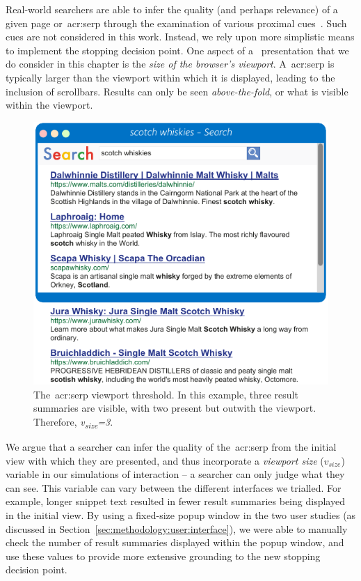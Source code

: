 Real-world searchers are able to infer the quality (and perhaps relevance) of a given page or~\gls{acr:serp} through the examination of various proximal cues~\citep{chi2001information_scent}. Such cues are not considered in this work. Instead, we rely upon more simplistic means to implement the stopping decision point. One aspect of a~ presentation that we do consider in this chapter is the \emph{size of the browser's viewport}. A~\gls{acr:serp} is typically larger than the viewport within which it is displayed, leading to the inclusion of scrollbars. Results can only be seen \emph{above-the-fold}, or what is visible within the viewport.

\begin{figure}
    \begin{center}
    \vspace*{-9mm}
    \includegraphics[width=1\textwidth]{figures/ch6-viewport.pdf}
    \end{center}
    \vspace*{-2mm}
    \caption[Viewport cutoff example]{The~\gls{acr:serp} viewport threshold. In this example, three result summaries are visible, with two present but outwith the viewport. Therefore, \emph{v\textsubscript{size}=3}.}
    \label{fig:viewport_cutoff}
\end{figure}

We argue that a searcher can infer the quality of the~\gls{acr:serp} from the initial view with which they are presented, and thus incorporate a \emph{viewport size} ($v_{size}$) variable in our simulations of interaction -- a searcher can only judge what they can see. This variable can vary between the different interfaces we trialled. For example, longer snippet text resulted in fewer result summaries being displayed in the initial view. By using a fixed-size popup window in the two user studies (as discussed in Section~\ref{sec:methodology:user:interface}), we were able to manually check the number of result summaries displayed within the popup window, and use these values to provide more extensive grounding to the new stopping decision point.

